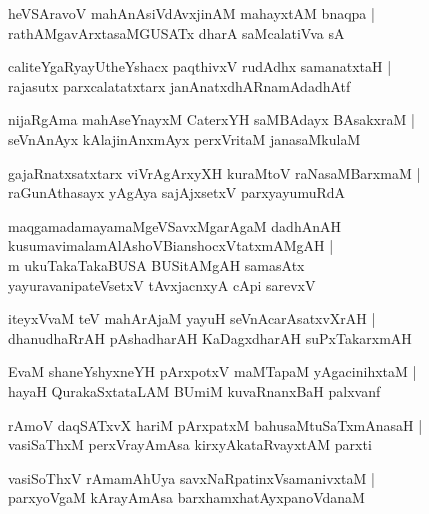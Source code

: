 \documentclass[twoside,12pt,openright]{book}
\newcounter{shloka}[chapter]
\begin{document}
\begin{shloka}%
heVSAravoV mahAnAsiVdAvxjinAM mahayxtAM bnaqpa |\\
rathAMgavArxtasaMGUSATx dharA saMcalatiVva sA
\end{shloka}

\begin{shloka}%
caliteYgaRyayUtheYshacx paqthivxV rudAdhx samanatxtaH |\\
rajasutx parxcalatatxtarx janAnatxdhARnamAdadhAtf 
\end{shloka}

\begin{shloka}%
nijaRgAma mahAseYnayxM CaterxYH saMBAdayx BAsakxraM |\\
seVnAnAyx kAlajinAnxmAyx perxVritaM janasaMkulaM 
\end{shloka}

\begin{shloka}%
gajaRnatxsatxtarx viVrAgArxyXH kuraMtoV raNasaMBarxmaM |\\
raGunAthasayx yAgAya sajAjxsetxV parxyayumuRdA 
\end{shloka}

\begin{shloka}%
maqgamadamayamaMgeVSavxMgarAgaM dadhAnAH\\
kusumavimalamAlAshoVBianshocxVtatxmAMgAH |\\
m ukuTakaTakaBUSA BUSitAMgAH samasAtx\\
yayuravanipateVsetxV tAvxjacnxyA cApi sarevxV
\end{shloka}

\begin{shloka}%
iteyxVvaM teV mahArAjaM yayuH seVnAcarAsatxvXrAH |\\
dhanudhaRrAH pAshadharAH KaDagxdharAH suPxTakarxmAH 
\end{shloka}

\begin{shloka}%
EvaM shaneYshyxneYH pArxpotxV maMTapaM yAgacinihxtaM |\\
hayaH QurakaSxtataLAM BUmiM kuvaRnanxBaH palxvanf 
\end{shloka}

\begin{shloka}%
rAmoV daqSATxvX hariM pArxpatxM bahusaMtuSaTxmAnasaH |\\
vasiSaThxM perxVrayAmAsa kirxyAkataRvayxtAM parxti
\end{shloka}

\begin{shloka}%
vasiSoThxV rAmamAhUya savxNaRpatinxVsamanivxtaM |\\
parxyoVgaM kArayAmAsa barxhamxhatAyxpanoVdanaM 
\end{shloka}
\end{document}
